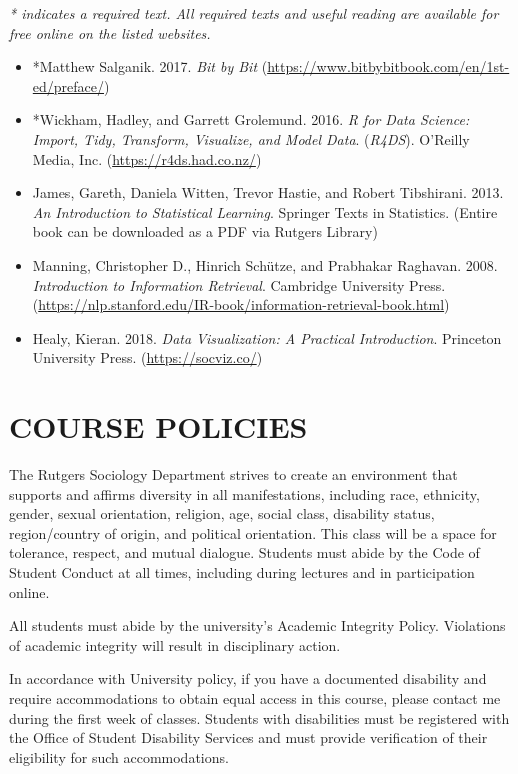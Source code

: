 \documentclass[
  10pt,
]{article}
\providecommand{\tightlist}{%
  \setlength{\itemsep}{0pt}\setlength{\parskip}{0pt}}
\begin{document}
\emph{* indicates a required text. All required texts and useful reading
are available for free online on the listed websites.}

\begin{itemize}
\tightlist
\item
  *Matthew Salganik. 2017. \emph{Bit by Bit}
  (\url{https://www.bitbybitbook.com/en/1st-ed/preface/})
\item
  *Wickham, Hadley, and Garrett Grolemund. 2016. \emph{R for Data
  Science: Import, Tidy, Transform, Visualize, and Model Data}.
  (\emph{R4DS}). O'Reilly Media, Inc. (\url{https://r4ds.had.co.nz/})
\item
  James, Gareth, Daniela Witten, Trevor Hastie, and Robert Tibshirani.
  2013. \emph{An Introduction to Statistical Learning}. Springer Texts
  in Statistics. (Entire book can be downloaded as a PDF via Rutgers
  Library)
\item
  Manning, Christopher D., Hinrich Schütze, and Prabhakar Raghavan.
  2008. \emph{Introduction to Information Retrieval}. Cambridge
  University Press.
  (\url{https://nlp.stanford.edu/IR-book/information-retrieval-book.html})
\item
  Healy, Kieran. 2018. \emph{Data Visualization: A Practical
  Introduction}. Princeton University Press. (\url{https://socviz.co/})
\end{itemize}

\hypertarget{course-policies}{%
\section{COURSE POLICIES}\label{course-policies}}

The Rutgers Sociology Department strives to create an environment that
supports and affirms diversity in all manifestations, including race,
ethnicity, gender, sexual orientation, religion, age, social class,
disability status, region/country of origin, and political orientation.
This class will be a space for tolerance, respect, and mutual dialogue.
Students must abide by the Code of Student Conduct at all times,
including during lectures and in participation online.

All students must abide by the university's Academic Integrity Policy.
Violations of academic integrity will result in disciplinary action.

In accordance with University policy, if you have a documented
disability and require accommodations to obtain equal access in this
course, please contact me during the first week of classes. Students
with disabilities must be registered with the Office of Student
Disability Services and must provide verification of their eligibility
for such accommodations.
\end{document}
